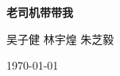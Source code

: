 \documentclass[hyperref, twocolumn]{article}
\begin{document}
\begin{titlepage}
    \centering
    \vspace*{2cm}

    {\Huge\bfseries 老司机带带我\par}
    \vspace{10cm}

    {\Large 吴子健 \quad 林宇煌 \quad 朱芝毅 \par}
    \vspace{0.5cm}

    {\large \today\par}
    \vspace{2cm}
\end{titlepage}

\tableofcontents







\end{document}
